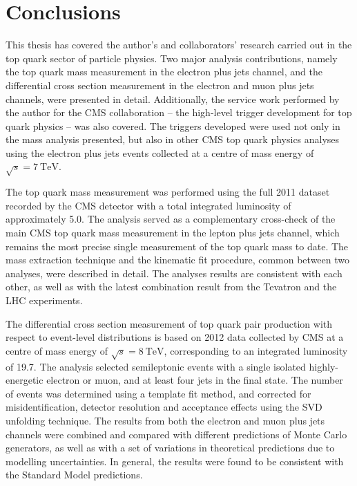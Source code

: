 
\def\baselinestretch{1}
\chapter{Conclusions}
\label{c:conclusions}
\ifpdf
    \graphicspath{{Conclusions/plots/}}
\else
    \graphicspath{{Conclusions/plots/EPS/}{Conclusions/plots/}}
\fi

\def\baselinestretch{1.66}

This thesis has covered the author's and collaborators' research carried out in the top quark sector of particle
physics. Two major analysis contributions, namely the top quark mass measurement in the electron plus jets channel, and
the \ttbar differential cross section measurement in the electron and muon plus jets channels, were presented in detail.
Additionally, the service work performed by the author for the CMS collaboration -- the high-level trigger development
for top quark physics -- was also covered. The triggers developed were used not only in the mass analysis presented, but
also in other CMS top quark physics analyses using the electron plus jets \ttbar events collected at a centre of mass
energy of $\sqrt{s} = \SI{7}{\TeV}$.

The top quark mass measurement was performed using the full 2011 dataset recorded by the CMS detector with a total
integrated luminosity of approximately \SI{5.0}{\fbinv}. The analysis served as a complementary cross-check of the main
CMS top quark mass measurement in the lepton plus jets channel, which remains the most precise single measurement of the
top quark mass to date. The mass extraction technique and the kinematic fit procedure, common between two analyses, were
described in detail. The analyses results are consistent with each other, as well as with the latest combination result
from the Tevatron and the LHC experiments.

The differential cross section measurement of top quark pair production with respect to event-level distributions is
based on 2012 data collected by CMS at a centre of mass energy of $\sqrt{s} = \SI{8}{\TeV}$, corresponding to an
integrated luminosity of \SI{19.7}{\fbinv}. The analysis selected semileptonic \ttbar events with a single isolated
highly-energetic electron or muon, and at least four jets in the final state. The number of \ttbar events was determined
using a template fit method, and corrected for misidentification, detector resolution and acceptance effects using the
SVD unfolding technique. The results from both the electron and muon plus jets channels were combined and compared with
different predictions of Monte Carlo generators, as well as with a set of variations in theoretical predictions due to
modelling uncertainties. In general, the results were found to be consistent with the Standard Model predictions.

